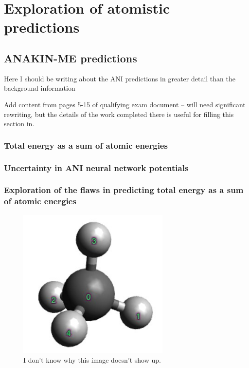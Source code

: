 \chapter{Exploration of atomistic predictions}






\section{ANAKIN-ME predictions}
Here I should be writing about the ANI predictions in greater detail than the background information

Add content from pages 5-15 of qualifying exam document -- will need significant rewriting, but the details of the work completed there is useful for filling this section in. 
\subsection{Total energy as a sum of atomic energies}

\subsection{Uncertainty in ANI neural network potentials}

\subsection{Exploration of the flaws in predicting total energy as a sum of atomic energies}


\begin{figure}[!hb]
    \centering
    \includegraphics[width=3in]{Images/CH4.jpg}
    \caption{I don't know why this image doesn't show up.}
    \label{ch4}
\end{figure}{}

